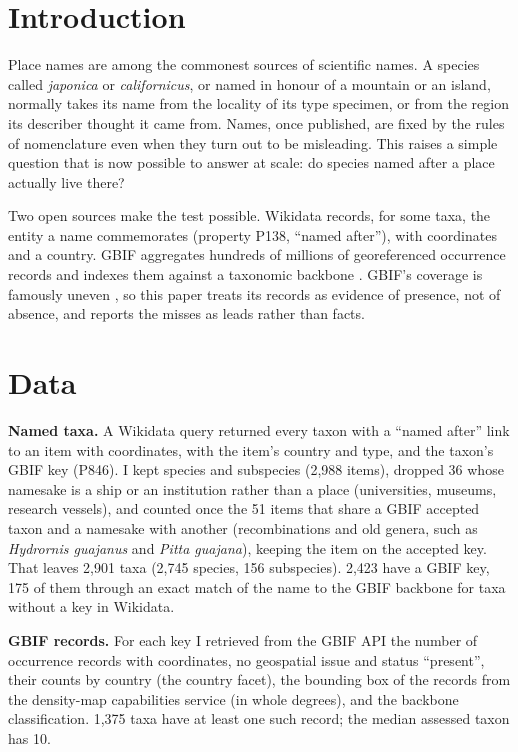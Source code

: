 \documentclass[11pt,a4paper]{article}
\begin{document}
\section{Introduction}
Place names are among the commonest sources of scientific names. A species called \textit{japonica} or \textit{californicus}, or named in honour of a mountain or an island, normally takes its name from the locality of its type specimen, or from the region its describer thought it came from. Names, once published, are fixed by the rules of nomenclature even when they turn out to be misleading. This raises a simple question that is now possible to answer at scale: do species named after a place actually live there?

Two open sources make the test possible. Wikidata \citep{wikidata} records, for some taxa, the entity a name commemorates (property P138, ``named after''), with coordinates and a country. GBIF aggregates hundreds of millions of georeferenced occurrence records and indexes them against a taxonomic backbone \citep{gbif}. GBIF's coverage is famously uneven \citep{beck2014,meyer2016}, so this paper treats its records as evidence of presence, not of absence, and reports the misses as leads rather than facts.

\section{Data}
\textbf{Named taxa.} A Wikidata query returned every taxon with a ``named after'' link to an item with coordinates, with the item's country and type, and the taxon's GBIF key (P846). I kept species and subspecies (2,988 items), dropped 36 whose namesake is a ship or an institution rather than a place (universities, museums, research vessels), and counted once the 51 items that share a GBIF accepted taxon and a namesake with another (recombinations and old genera, such as \textit{Hydrornis guajanus} and \textit{Pitta guajana}), keeping the item on the accepted key. That leaves 2,901 taxa (2,745 species, 156 subspecies). 2,423 have a GBIF key, 175 of them through an exact match of the name to the GBIF backbone for taxa without a key in Wikidata.

\textbf{GBIF records.} For each key I retrieved from the GBIF API the number of occurrence records with coordinates, no geospatial issue and status ``present'', their counts by country (the country facet), the bounding box of the records from the density-map capabilities service (in whole degrees), and the backbone classification. 1,375 taxa have at least one such record; the median assessed taxon has 10.
\end{document}
